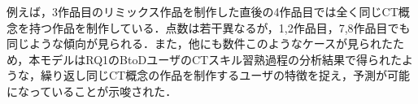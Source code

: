 \documentclass[submit,ses,noauthor]{ipsj}
\newcommand{\todo}[1]{\colorbox{yellow}{{\bf TODO}:}{\color{red} {\textbf{[#1]}}}}
\begin{document}






例えば，3作品目のリミックス作品を制作した直後の4作品目では全く同じCT概念を持つ作品を制作している．点数は若干異なるが，1,2作品目，7,8作品目でも同じような傾向が見られる．また，他にも数件このようなケースが見られたため，本モデルはRQ1のBtoDユーザのCTスキル習熟過程の分析結果で得られたような，繰り返し同じCT概念の作品を制作するユーザの特徴を捉え，予測が可能になっていることが示唆された．

\end{document}
